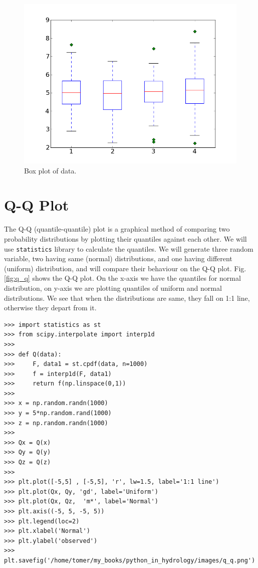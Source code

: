 \documentclass[10pt]{book}
\begin{document}
\beforefig
\begin{figure}[h!]
  \centering
    \includegraphics[scale=0.5]{images/boxplot.png}
  \caption{Box plot of data.}
   \label{fig:boxplot}
\end{figure}
\afterfig

\section{Q-Q Plot}
The Q-Q (quantile-quantile) plot is a graphical method of comparing two probability distributions by plotting their quantiles against each other. We will use \verb"statistics" library to calculate the quantiles. We will generate three random variable, two having same (normal) distributions, and one having different (uniform) distribution, and will compare their behaviour on the Q-Q plot. Fig. \ref{fig:q_q} shows the Q-Q plot. On the x-axis we have the quantiles for normal distribution, on y-axis we are plotting quantiles of uniform and normal distributions. We  see that when the distributions are same, they fall on 1:1 line, otherwise they depart from it. 
\beforeverb \begin{verbatim}
>>> import statistics as st
>>> from scipy.interpolate import interp1d
>>> 
>>> def Q(data):
>>>     F, data1 = st.cpdf(data, n=1000)
>>>     f = interp1d(F, data1)
>>>     return f(np.linspace(0,1))
>>> 
>>> x = np.random.randn(1000)
>>> y = 5*np.random.rand(1000)
>>> z = np.random.randn(1000)
>>> 
>>> Qx = Q(x)
>>> Qy = Q(y)
>>> Qz = Q(z)
>>> 
>>> plt.plot([-5,5] , [-5,5], 'r', lw=1.5, label='1:1 line')
>>> plt.plot(Qx, Qy, 'gd', label='Uniform')
>>> plt.plot(Qx, Qz,  'm*', label='Normal')
>>> plt.axis((-5, 5, -5, 5))
>>> plt.legend(loc=2)
>>> plt.xlabel('Normal')
>>> plt.ylabel('observed')
>>> plt.savefig('/home/tomer/my_books/python_in_hydrology/images/q_q.png')
\end{verbatim} \afterverb
\end{document}
